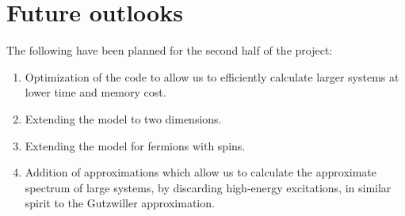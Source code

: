 \pagebreak
\section{Future outlooks}
The following have been planned for the second half of the project:
\begin{enumerate}
	\item Optimization of the code to allow us to efficiently calculate larger systems at lower time and memory cost.
	
	\item Extending the model to two dimensions.
	
	\item Extending the model for fermions with spins.
	
	\item Addition of approximations which allow us to calculate the approximate spectrum of large systems, by discarding high-energy excitations, in similar spirit to the Gutzwiller approximation.
\end{enumerate}